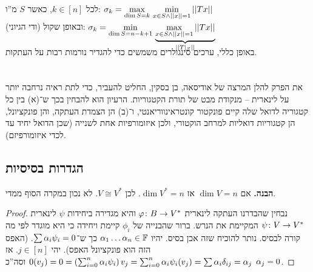 \documentclass[name=רשימות אלגברה לינארית 2א]{../../../tex/classes/megasumPreamble}
\begin{document}
	\begin{Theorem}
		לכל $k \in [n]$, כאשר $S$ מ''ו: \hfill 
		$\displaystyle \sigma_k = \max_{\dim S = k} \, \min_{{x \in S\land \left \vert \left \vert x \right \vert \right \vert = 1}} \left \vert \left \vert Tx \right \vert \right \vert$ \\
		ובאופן שקול (ודי הגיוני): \hfill 
		$\displaystyle \sigma_k = \min_{{\dim S = n - k + 1}} \,\smash{\underbrace{\max_{x \in S \land \left \vert \left \vert x \right \vert \right \vert = 1} \left \vert \left \vert Tx \right \vert \right \vert}_{\left \vert \left \vert T|_S \right \vert \right \vert}}$
	\end{Theorem}
	באופן כללי, ערכים סינגולרים משמשים כדי להגדיר נורמות רבות על העתקות. 
	
	
	
	
	
	\npage
	
	
	\section[מרחבים דואלים]{}
	את הפרק להלן המרצה של אודיסאה, בן בסקין, החליט להעביר, כדי לתת ראיה נרחבה יותר על לינארית – מנקודת מבט של תורת הקטגוריות. הרעיון הוא להבחין בכך ש־(א) בין כל קטגוריה לדואל שלה קיים פונקטור קונטראינווריאנטי, ו־(ב) הן הצמדת העתקה, והן פונקציונל, הן קטגוריות דואליות למרחב הוקטורי, ולכן איזומורפיות אחת לשנייה (שכן הדואל יחיד עד לכדי איזומורפיזם). 
	\subsection{הגדרות בסיסיות}
	
	\textbf{הבנה. }אם $\dim V = n$ אז $\dim V^* = n$. לכן $V \cong V^*$. לא נכון במקרה הסוף ממדי. 
	
	
	\begin{proof}
		נבחין שהבדרנו העתקה לינארית $\varphi \colon B \to V^*$ והיא מגדירה ביחידות $\psi$ לינארית   $\psi \colon V \to V^*$ המקיימת את הנרש. ברור שהבנייה של $\phi_i$ קיימת ויחידה כי היא מוגדר לפי מה קורה לבסיס. נותר להוכיח שזה אכן בסיס. יהיו $\alpha_1 \dots \alpha_n \in \mathbb{F}$ כך ש־$\sum\alpha_i \psi_i = 0$. (האפס הזה הוא פונקציונל האפס). יהי $j \in [n]$. אז $0(v_j) = 0 = \left ( \sum_{i = 0}^{n} \alpha_i \psi_i \right )v_j = \sum_{i = 0}^{n} \alpha_i \psi_i(v_j) = \sum\alpha_i \delta_{ij} = \alpha_j$ וסה''כ $\alpha_j = 0$. 
	\end{proof}
	
\end{document}
